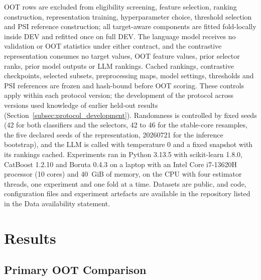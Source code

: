 \documentclass[final,5p,twocolumn]{elsarticle}
\begin{document}
OOT rows are excluded from eligibility screening, feature selection, ranking construction, representation training, hyperparameter choice, threshold selection and PSI reference construction; all target-aware components are fitted fold-locally inside DEV and refitted once on full DEV. The language model receives no validation or OOT statistics under either contract, and the contrastive representation consumes no target values, OOT feature values, prior selector ranks, prior model outputs or LLM rankings. Cached rankings, contrastive checkpoints, selected subsets, preprocessing maps, model settings, thresholds and PSI references are frozen and hash-bound before OOT scoring. These controls apply within each protocol version; the development of the protocol across versions used knowledge of earlier held-out results (Section~\ref{subsec:protocol_development}). Randomness is controlled by fixed seeds (42 for both classifiers and the selectors, 42 to 46 for the stable-core resamples, the five declared seeds of the representation, 20260721 for the inference bootstrap), and the LLM is called with temperature 0 and a fixed snapshot with its rankings cached. Experiments ran in Python 3.13.5 with scikit-learn 1.8.0, CatBoost 1.2.10 and Boruta 0.4.3 on a laptop with an Intel Core i7-13620H processor (10 cores) and 40~GiB of memory, on the CPU with four estimator threads, one experiment and one fold at a time. Datasets are public, and code, configuration files and experiment artefacts are available in the repository listed in the Data availability statement.


\section{Results}
\label{sec:results}

\subsection{Primary OOT Comparison}
\label{subsec:primary_results}
\end{document}
